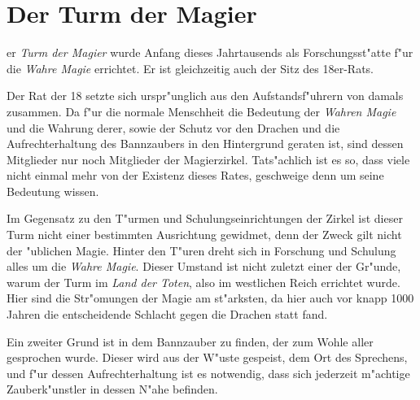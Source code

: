 \section{Der Turm der Magier}
\label{turmdermagier}

er \textit{Turm der Magier} wurde Anfang dieses Jahrtausends als
Forschungsst"atte f"ur die \textit{Wahre Magie} errichtet. Er ist
gleichzeitig auch der Sitz des 18er-Rats.
\par Der Rat der 18 setzte sich urspr"unglich aus den
Aufstandsf"uhrern von damals zusammen. Da f"ur die normale
Menschheit die Bedeutung der \textit{Wahren Magie} und die Wahrung
derer, sowie der Schutz vor den Drachen und die Aufrechterhaltung
des Bannzaubers in den Hintergrund geraten ist, sind dessen
Mitglieder nur noch Mitglieder der Magierzirkel. Tats"achlich ist es
so, dass viele nicht einmal mehr von der Existenz dieses Rates,
geschweige denn um seine Bedeutung wissen.
\par Im Gegensatz zu den T"urmen und Schulungseinrichtungen der Zirkel
ist dieser Turm nicht einer bestimmten Ausrichtung gewidmet, denn
der Zweck gilt nicht der "ublichen Magie. Hinter den T"uren dreht
sich in Forschung und Schulung alles um die \textit{Wahre Magie}.
Dieser Umstand ist nicht zuletzt einer der Gr"unde, warum der Turm
im \textit{Land der Toten}, also im westlichen Reich errichtet
wurde. Hier sind die Str"omungen der Magie am st"arksten, da hier
auch vor knapp 1000 Jahren die entscheidende Schlacht gegen die
Drachen statt fand.
\par Ein zweiter Grund ist in dem Bannzauber zu finden, der zum Wohle 
aller gesprochen wurde. Dieser wird aus der W"uste gespeist, dem Ort 
des Sprechens, und f"ur dessen Aufrechterhaltung ist es notwendig, 
dass sich jederzeit m"achtige Zauberk"unstler in dessen N"ahe befinden.
